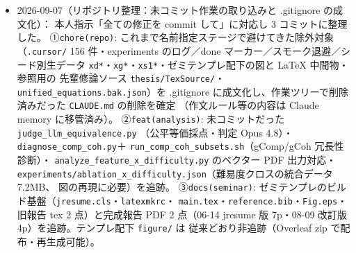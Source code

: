 \documentclass[11pt,a4paper]{jsarticle}
\begin{document}
\begin{itemize}[nosep]
    固定重み $(0.7, 0.3)$ では min--max 正規化した文章項の実効重みが生コサインより大きく、BM25 0.247 / E5 0.428（A）に落ちる。
    「同じ重み」の意味が正規化に依存するため、表では最良混合で比較した。
    \textbf{修論への反映}：\S5.2 に外部ベースライン 2 種の定義（内部 1・外部 3 に修正）、
    \S6.1 の表 \texttt{tab:overall} に設定ごと BM25・E5 の 2 行追加と段落 1 本（文章のみ／最良混合／$(0.7,0.3)$／被覆率／検定）、
    図 \texttt{fig:comparison} のキャプションを 3 手法名で明示、\S6.9 Limitations に第 7 項（既製エンコーダ・未微調整）、
    付録 A.1 に BM25・E5 の設定 3 行、参考文献に E5（Wang ら, arXiv:2212.03533、31 件目、初出順を維持）。
    \texttt{latexmk -gg} exit 0・28 ページ・未定義引用なし。第 1・7 章（骨子）には W2/W3 で反映するためのメモを残した。
    データ：\texttt{experiments/external\_baselines\_A.json / \_B.json}（60 ラベル $\times$ per-seed）、
    \texttt{external\_baselines\_coverage.json}（被覆率 $k=10$--400）、\texttt{external\_baselines\_stats.json}（対応あり検定）。
    E5 の埋め込みキャッシュ \texttt{experiments/embeddings/} は再生成可能なので非追跡（.gitignore）。
    設計書 \texttt{docs/superpowers/specs/2026-09-07-a2-external-baselines-design.md}。
  \item 2026-09-07（リポジトリ整理：未コミット作業の取り込みと .gitignore の成文化）：
    本人指示「全ての修正を commit して」に対応し 3 コミットに整理した。
    ①\texttt{chore(repo)}: これまで名前指定ステージで避けてきた除外対象
    （\texttt{.cursor/} 156 件・experiments のログ／done マーカー／スモーク退避／シード別生データ
    \texttt{xd*}・\texttt{xg*}・\texttt{xs1*}・ゼミテンプレ配下の図と LaTeX 中間物・参照用の
    先輩修論ソース \texttt{thesis/TexSource/}・\texttt{unified\_equations.bak.json}）を
    .gitignore に成文化し、作業ツリーで削除済みだった \texttt{CLAUDE.md} の削除を確定
    （作文ルール等の内容は Claude memory に移管済み）。
    ②\texttt{feat(analysis)}: 未コミットだった \texttt{judge\_llm\_equivalence.py}
    （公平等価採点・判定 Opus 4.8）・\texttt{diagnose\_comp\_coh.py}＋
    \texttt{run\_comp\_coh\_subsets.sh}（gComp/gCoh 冗長性診断）・
    \texttt{analyze\_feature\_x\_difficulty.py} のベクター PDF 出力対応・
    \texttt{experiments/ablation\_x\_difficulty.json}（難易度クロスの統合データ 7.2MB、
    図の再現に必要）を追跡。
    ③\texttt{docs(seminar)}: ゼミテンプレのビルド基盤（\texttt{jresume.cls}・\texttt{latexmkrc}・
    \texttt{main.tex}・\texttt{reference.bib}・\texttt{Fig.eps}・旧報告 tex 2 点）と完成報告 PDF
    2 点（06-14 jresume 版 7p・08-09 改訂版 4p）を追跡。テンプレ配下 \texttt{figure/} は
    従来どおり非追跡（Overleaf zip で配布・再生成可能）。

\end{itemize}
\end{document}

